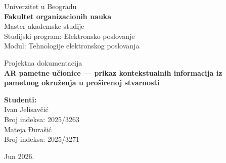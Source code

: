 \documentclass[12pt,a4paper]{article}
\begin{document}
\begin{titlepage}
\centering
{\large Univerzitet u Beogradu}\\[0.4em]
{\Large \textbf{Fakultet organizacionih nauka}}\\[1em]
{\large Master akademske studije}\\[0.4em]
{\large Studijski program: Elektronsko poslovanje}\\[0.4em]
{\large Modul: Tehnologije elektronskog poslovanja}

\vspace{4.5cm}

{\large Projektna dokumentacija}\\[1.2em]
{\LARGE \textbf{AR pametne učionice --- prikaz kontekstualnih informacija iz pametnog okruženja u proširenoj stvarnosti}}

\vfill

\begin{flushright}
{\large \textbf{Studenti:}}\\[0.3em]
{\large Ivan Jelisavčić}\\[0.3em]
{\large Broj indeksa: 2025/3263}\\[0.6em]
{\large Mateja Đurašić}\\[0.3em]
{\large Broj indeksa: 2025/3271}
\end{flushright}

\vspace{1.8cm}

{\large Jun 2026.}
\end{titlepage}

\tableofcontents
\newpage







\end{document}
